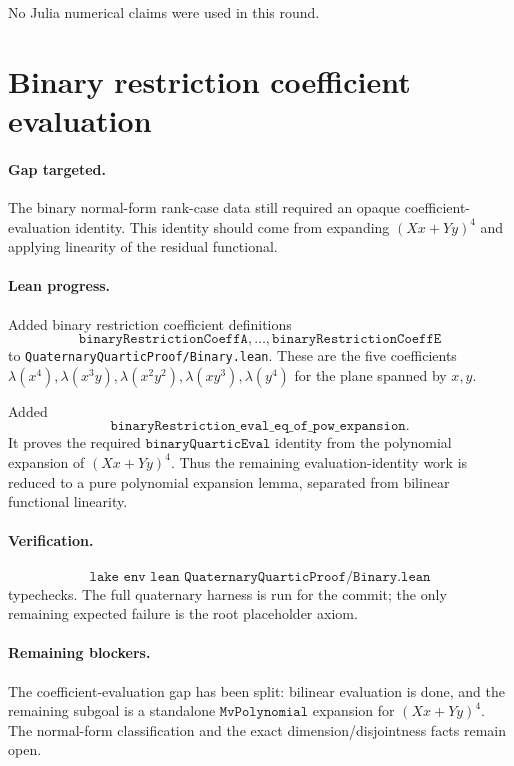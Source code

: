 \documentclass[11pt]{article}
\begin{document}
No Julia numerical claims were used in this round.

\section*{Binary restriction coefficient evaluation}

\paragraph{Gap targeted.}
The binary normal-form rank-case data still required an opaque
coefficient-evaluation identity.  This identity should come from expanding
\((Xx+Yy)^4\) and applying linearity of the residual functional.

\paragraph{Lean progress.}
Added binary restriction coefficient definitions
\[
\texttt{binaryRestrictionCoeffA},\ldots,
\texttt{binaryRestrictionCoeffE}
\]
to \texttt{QuaternaryQuarticProof/Binary.lean}.  These are the five coefficients
\(\lambda(x^4),\lambda(x^3y),\lambda(x^2y^2),\lambda(xy^3),\lambda(y^4)\)
for the plane spanned by \(x,y\).

Added
\[
\texttt{binaryRestriction\_eval\_eq\_of\_pow\_expansion}.
\]
It proves the required \(\texttt{binaryQuarticEval}\) identity from the
polynomial expansion of \((Xx+Yy)^4\).  Thus the remaining evaluation-identity
work is reduced to a pure polynomial expansion lemma, separated from bilinear
functional linearity.

\paragraph{Verification.}
\[
\texttt{lake env lean QuaternaryQuarticProof/Binary.lean}
\]
typechecks.  The full quaternary harness is run for the commit; the only
remaining expected failure is the root placeholder axiom.

\paragraph{Remaining blockers.}
The coefficient-evaluation gap has been split: bilinear evaluation is done,
and the remaining subgoal is a standalone \(\texttt{MvPolynomial}\) expansion
for \((Xx+Yy)^4\).  The normal-form classification and the exact
dimension/disjointness facts remain open.
\end{document}
